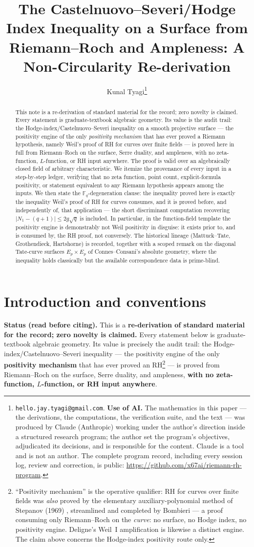 \documentclass[11pt]{article}
\title{The Castelnuovo--Severi/Hodge Index Inequality on a Surface from Riemann--Roch and Ampleness: A Non-Circularity Re-derivation}
\author{Kunal Tyagi\thanks{%
\texttt{hello.jay.tyagi@gmail.com}. \textbf{Use of AI.} The mathematics in this
paper --- the derivations, the computations, the verification suite, and the
text --- was produced by Claude (Anthropic) working under the author's direction
inside a structured research program; the author set the program's objectives,
adjudicated its decisions, and is responsible for the content. Claude is a tool and
is not an author. The complete program record, including every session log, review
and correction, is public: \url{https://github.com/x67ai/riemann-rh-program}.}}
\date{}
\theoremstyle{definition}
\theoremstyle{remark}
\newcommand{\Fq}{\mathbb{F}_q}
\begin{document}
\maketitle

\begin{abstract}
This note is a re-derivation of standard material for the record; zero novelty is claimed.
Every statement is graduate-textbook algebraic geometry. Its value is the audit trail: the
Hodge-index/Castelnuovo--Severi inequality on a smooth projective surface --- the positivity
engine of the only \emph{positivity mechanism} that has ever proved a Riemann hypothesis,
namely Weil's proof of RH for curves over finite fields --- is proved here in full from
Riemann--Roch on the surface, Serre duality, and ampleness, with no zeta-function,
$L$-function, or RH input anywhere. The proof is valid over an algebraically closed field of
arbitrary characteristic. We itemize the provenance of every input in a step-by-step ledger,
verifying that no zeta function, point count, explicit-formula positivity, or statement
equivalent to any Riemann hypothesis appears among the inputs. We then state the
$\Fq$-degeneration clause: the inequality proved here is exactly the inequality Weil's proof
of RH for curves consumes, and it is proved before, and independently of, that application ---
the short discriminant computation recovering $|N_1 - (q+1)| \le 2g\sqrt{q}$ is included. In
particular, in the function-field template the positivity engine is demonstrably not Weil
positivity in disguise: it exists prior to, and is consumed by, the RH proof, not conversely.
The historical lineage (Mattuck--Tate, Grothendieck, Hartshorne) is recorded, together with a
scoped remark on the diagonal Tate-curve surfaces $E_p \times E_p$ of Connes--Consani's
absolute geometry, where the inequality holds classically but the available correspondence
data is prime-blind.
\end{abstract}

\section*{Introduction and conventions}

\textbf{Status (read before citing).} This is a \textbf{re-derivation of standard material
for the record; zero novelty is claimed.} Every statement below is graduate-textbook
algebraic geometry. Its value is precisely the audit trail: the
Hodge-index/Castelnuovo--Severi inequality --- the positivity engine of the only
\textbf{positivity mechanism} that has ever proved an RH\footnote{``Positivity mechanism''
is the operative qualifier: RH for curves over finite fields was \emph{also} proved by the
elementary auxiliary-polynomial method of Stepanov (1969) \cite{Stepanov}, streamlined and
completed by Bombieri \cite{Bombieri} --- a proof consuming only Riemann--Roch on the
\emph{curve}: no surface, no Hodge index, no positivity engine. Deligne's Weil~I
amplification is likewise a distinct engine. The claim above concerns the Hodge-index
positivity route only.} --- is proved from Riemann--Roch on the surface, Serre duality, and
ampleness, \textbf{with no zeta-function, $L$-function, or RH input anywhere}.
\end{document}
